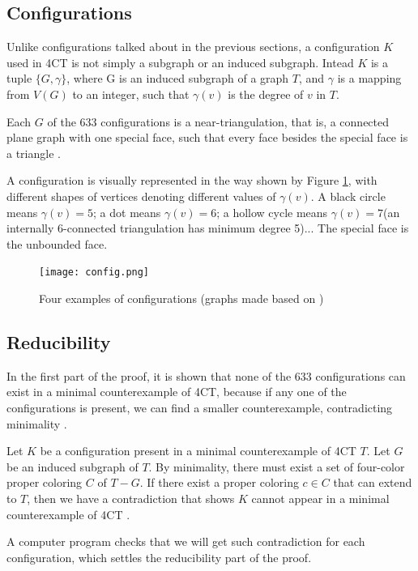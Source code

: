 \documentclass[a4paper, 11pt]{article} %
\begin{document}
\subsection{Configurations}

Unlike configurations talked about in the previous sections, a configuration $K$ used in 4CT is not simply a subgraph or an induced subgraph. Intead $K$ is a tuple $\{G, \gamma\}$, where G is an induced subgraph of a graph $T$, and $\gamma$ is a mapping from $V(G)$ to an integer, such that $\gamma(v)$ is the degree of $v$ in $T$.

Each $G$ of the 633 configurations is a near-triangulation, that is, a connected plane graph with one special face, such that every face besides the special face is a triangle \cite{thomas1998update}. 

A configuration is visually represented in the way shown by Figure \ref{fig:config}, with different shapes of vertices denoting different values of $\gamma(v)$. A black circle means $\gamma(v) = 5$; a dot means $\gamma(v) = 6$; a hollow cycle means $\gamma(v) = 7$(an internally 6-connected triangulation has minimum degree 5)...\cite{thomas1998update} The special face is the unbounded face. 

\begin{figure}
\centering
\texttt{[image: config.png]}
\caption{Four examples of configurations (graphs made based on \cite{thomas1998update})}
\label{fig:config}
\end{figure}

\subsection{Reducibility}
In the first part of the proof, it is shown that none of the 633 configurations can exist in a minimal counterexample of 4CT, because if any one of the configurations is present, we can find a smaller counterexample, contradicting minimality \cite{thomas1998update}. 

Let $K$ be a configuration present in a minimal counterexample of 4CT $T$. Let $G$ be an induced subgraph of $T$. By minimality, there must exist a set of four-color proper coloring $C$ of $T-G$. If there exist a proper coloring $c \in C$ that can extend to $T$, then we have a contradiction that shows $K$ cannot appear in a minimal counterexample of 4CT \cite{thomas1998update}.

A computer program checks that we will get such contradiction for each configuration, which settles the reducibility part of the proof.
\end{document}
